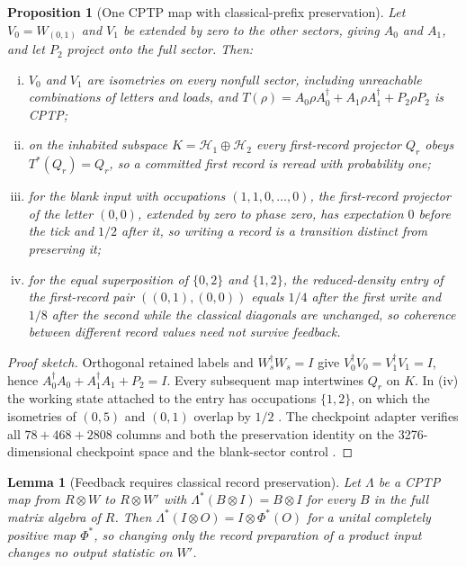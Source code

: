 \documentclass[11pt]{article}
\newtheorem{proposition}[theorem]{Proposition}
\newtheorem{lemma}[theorem]{Lemma}
\theoremstyle{definition}
\theoremstyle{remark}
\theoremstyle{plain}
\newcommand{\Hil}{\mathcal{H}}
\begin{document}
\begin{proposition}[One CPTP map with classical-prefix preservation]
\label{prop:cptp}
Let $V_0=W_{(0,1)}$ and $V_1$ be extended by zero to the other sectors, giving
$A_0$ and $A_1$, and let $P_2$ project onto the full sector. Then:
\begin{enumerate}[(i)]
\item $V_0$ and $V_1$ are isometries on every nonfull sector, including
unreachable combinations of letters and loads, and
$T(\rho)=A_0\rho A_0^\dagger+A_1\rho A_1^\dagger+P_2\rho P_2$ is CPTP;
\item on the inhabited subspace $K=\Hil_1\oplus\Hil_2$ every first-record
projector $Q_r$ obeys $T^*(Q_r)=Q_r$, so a committed first record is reread
with probability one;
\item for the blank input with occupations $(1,1,0,\dots,0)$, the
first-record projector of the letter $(0,0)$, extended by zero to phase zero,
has expectation $0$ before the tick and $1/2$ after it, so writing a record is
a transition distinct from preserving it;
\item for the equal superposition of $\{0,2\}$ and $\{1,2\}$, the
reduced-density entry of the first-record pair $((0,1),(0,0))$ equals $1/4$
after the first write and $1/8$ after the second while the classical
diagonals are unchanged, so coherence between different record values need
not survive feedback.
\end{enumerate}
\end{proposition}

\begin{proof}[Proof sketch]
Orthogonal retained labels and $W_s^\dagger W_s=I$ give
$V_0^\dagger V_0=V_1^\dagger V_1=I$, hence $A_0^\dagger A_0+A_1^\dagger
A_1+P_2=I$. Every subsequent map intertwines $Q_r$ on $K$. In (iv) the
working state attached to the entry has occupations $\{1,2\}$, on which the
isometries of $(0,5)$ and $(0,1)$ overlap by $1/2$ \cite{oDERIV}. The
checkpoint adapter verifies all $78+468+2808$ columns and both the
preservation identity on the 3276-dimensional checkpoint space and the
blank-sector control \cite{csDERIV,rCS}.
\end{proof}

\begin{lemma}[Feedback requires classical record preservation]
\label{lem:multiplicative}
Let $\Lambda$ be a CPTP map from $R\otimes W$ to $R\otimes W'$ with
$\Lambda^*(B\otimes I)=B\otimes I$ for every $B$ in the full matrix algebra
of $R$. Then $\Lambda^*(I\otimes O)=I\otimes\Phi^*(O)$ for a unital
completely positive map $\Phi^*$, so changing only the record preparation of
a product input changes no output statistic on $W'$.
\end{lemma}
\end{document}

